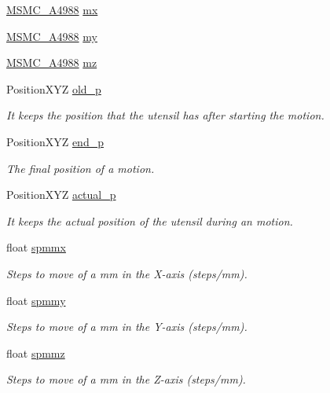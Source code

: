 \begin{DoxyCompactItemize}
\item 
\hyperlink{class_m_s_m_c___a4988}{M\+S\+M\+C\+\_\+\+A4988} \hyperlink{class_c_n_c___router_aa6009653314607491aa277b1f3c9bf85}{mx}
\item 
\hyperlink{class_m_s_m_c___a4988}{M\+S\+M\+C\+\_\+\+A4988} \hyperlink{class_c_n_c___router_ac3fb4521615d90ff7baa6bdb287d97c9}{my}
\item 
\hyperlink{class_m_s_m_c___a4988}{M\+S\+M\+C\+\_\+\+A4988} \hyperlink{class_c_n_c___router_add549ccc206f5feff41f9e818e370ef8}{mz}
\item 
Position\+X\+Y\+Z \hyperlink{class_c_n_c___router_afd338336ec37545574369a5f71ff310b}{old\+\_\+p}
\begin{DoxyCompactList}\small\item\em It keeps the position that the utensil has after starting the motion. \end{DoxyCompactList}\item 
Position\+X\+Y\+Z \hyperlink{class_c_n_c___router_a025944e9009cd9b63b6105c41f4665c3}{end\+\_\+p}
\begin{DoxyCompactList}\small\item\em The final position of a motion. \end{DoxyCompactList}\item 
Position\+X\+Y\+Z \hyperlink{class_c_n_c___router_a5e1d4c6b520762621889824c192e13fb}{actual\+\_\+p}
\begin{DoxyCompactList}\small\item\em It keeps the actual position of the utensil during an motion. \end{DoxyCompactList}\item 
float \hyperlink{class_c_n_c___router_ad8830a7b387905027b8a1a9e3b31e3c7}{spmmx}
\begin{DoxyCompactList}\small\item\em Steps to move of a mm in the X-\/axis (steps/mm). \end{DoxyCompactList}\item 
float \hyperlink{class_c_n_c___router_ab44dd3a48e5c03f3484cd223cb8f9444}{spmmy}
\begin{DoxyCompactList}\small\item\em Steps to move of a mm in the Y-\/axis (steps/mm). \end{DoxyCompactList}\item 
float \hyperlink{class_c_n_c___router_a18bda26476d6fbe11fc6bb6ec69171ea}{spmmz}
\begin{DoxyCompactList}\small\item\em Steps to move of a mm in the Z-\/axis (steps/mm). \end{DoxyCompactList}\item 

\end{DoxyCompactItemize}
